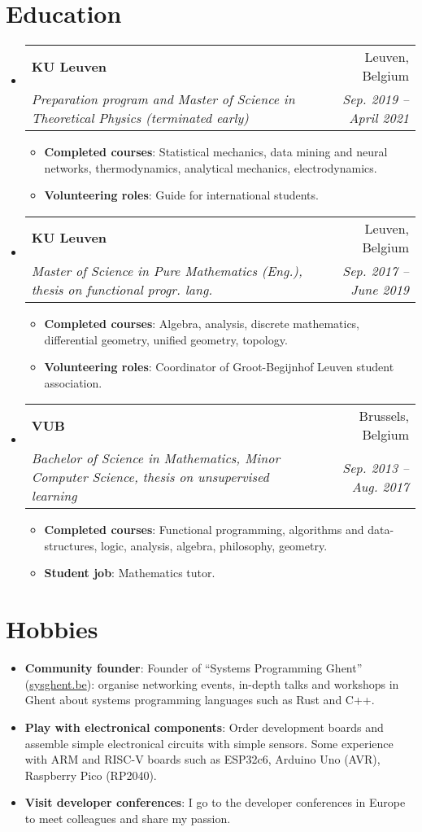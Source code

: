 \documentclass[a4,11pt]{article}
\makeatletter
\newcommand{\resumeItem}[2]{
  \item\small{
    \textbf{#1}{: #2 \vspace{-2pt}}
  }
}
\newcommand{\resumeSubheading}[4]{
  \vspace{-1pt}\item
    \begin{tabular*}{0.97\textwidth}{l@{\extracolsep{\fill}}r}
      \textbf{#1} & #2 \\
      \textit{\small#3} & \textit{\small #4} \\
    \end{tabular*}\vspace{-5pt}
}
\newcommand{\resumeSubHeadingListStart}{\begin{itemize}[leftmargin=*]}
\newcommand{\resumeSubHeadingListEnd}{\end{itemize}}
\newcommand{\resumeItemListStart}{\begin{itemize}}
\newcommand{\resumeItemListEnd}{\end{itemize}\vspace{-5pt}}
\makeatother
\begin{document}
\section{Education}
  \resumeSubHeadingListStart
    \resumeSubheading
      {KU Leuven}{Leuven, Belgium}
      {Preparation program and Master of Science in Theoretical Physics (terminated early)}{Sep. 2019 -- April 2021}
    \resumeItemListStart
        \resumeItem{Completed courses}{Statistical mechanics, data mining and neural networks, thermodynamics, analytical mechanics, electrodynamics.}
        \resumeItem{Volunteering roles}{Guide for international students.}
    \resumeItemListEnd
    \resumeSubheading
      {KU Leuven}{Leuven, Belgium}
      {Master of Science in Pure Mathematics (Eng.), thesis on functional progr. lang.}{Sep. 2017 -- June 2019}
    \resumeItemListStart
        \resumeItem{Completed courses}{Algebra, analysis, discrete mathematics, differential geometry, unified geometry, topology.}
        \resumeItem{Volunteering roles}{Coordinator of Groot-Begijnhof Leuven student association.}
    \resumeItemListEnd
    \resumeSubheading
      {VUB}{Brussels, Belgium}
      {Bachelor of Science in Mathematics, Minor Computer Science, thesis on unsupervised learning}{Sep. 2013 -- Aug. 2017}
        \resumeItemListStart
            \resumeItem{Completed courses}{Functional programming, algorithms and data-structures, logic, analysis, algebra, philosophy, geometry.}
            \resumeItem{Student job}{Mathematics tutor.}
        \resumeItemListEnd
  \resumeSubHeadingListEnd



\section{Hobbies}

\resumeSubHeadingListStart

\resumeItem{Community founder}{Founder of ``Systems Programming Ghent'' (\href{https://sysghent.be}{sysghent.be}): organise networking events, in-depth talks and workshops in Ghent about systems programming languages such as Rust and C++.}

\resumeItem{Play with electronical components}{Order development boards and assemble simple electronical circuits with simple sensors. Some experience with ARM and RISC-V boards such as ESP32c6, Arduino Uno (AVR), Raspberry Pico (RP2040).}
 
\resumeItem{Visit developer conferences}{I go to the developer conferences in Europe to meet colleagues and share my passion.}

\resumeSubHeadingListEnd

\end{document}
